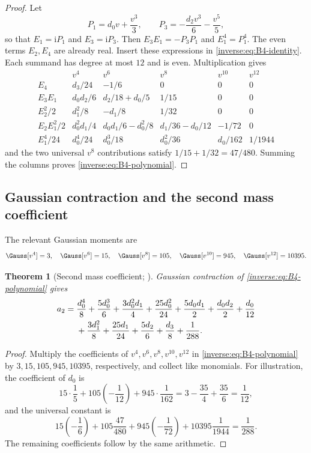 \documentclass[11pt,oneside]{article}
\newtheorem{theorem}{Theorem}[section]
\theoremstyle{definition}
\theoremstyle{remark}
\newcommand{\ii}{\mathrm i}
\begin{document}
\begin{proof}
Let
\[
 P_1=d_0v+\frac{v^3}{3},\qquad
 P_3=-\frac{d_2v^3}{6}-\frac{v^5}{5},
\]
so that $E_1=\ii P_1$ and $E_3=\ii P_3$.  Then
$E_3E_1=-P_3P_1$ and $E_1^4=P_1^4$.  The even terms $E_2,E_4$ are already
real.  Insert these expressions in \eqref{inverse:eq:B4-identity}.  Each summand
has degree at most $12$ and is even.  Multiplication gives
\[
\begin{array}{c|ccccc}
 &v^4&v^6&v^8&v^{10}&v^{12}\\
\hline
E_4&
 d_3/24&-1/6&0&0&0\\
E_3E_1&
 d_0d_2/6&d_2/18+d_0/5&1/15&0&0\\
E_2^2/2&
 d_1^2/8&-d_1/8&1/32&0&0\\
E_2E_1^2/2&
 d_0^2d_1/4&
 d_0d_1/6-d_0^2/8&
 d_1/36-d_0/12&
 -1/72&0\\
E_1^4/24&
 d_0^4/24&d_0^3/18&d_0^2/36&d_0/162&1/1944
\end{array}
\]
and the two universal $v^8$ contributions satisfy
$1/15+1/32=47/480$.  Summing the columns proves
\eqref{inverse:eq:B4-polynomial}.
\end{proof}

\subsection{Gaussian contraction and the second mass coefficient}

The relevant Gaussian moments are
\[
 \Gauss[v^4]=3,\quad
 \Gauss[v^6]=15,\quad
 \Gauss[v^8]=105,\quad
 \Gauss[v^{10}]=945,\quad
 \Gauss[v^{12}]=10395.
\]

\begin{theorem}[Second mass coefficient; \Formalized]
\label{inverse:thm:a2}
Gaussian contraction of \eqref{inverse:eq:B4-polynomial} gives
\begin{align}
 a_2={}&
 \frac{d_0^4}{8}+\frac{5d_0^3}{6}
 +\frac{3d_0^2d_1}{4}+\frac{25d_0^2}{24}
 +\frac{5d_0d_1}{2}+\frac{d_0d_2}{2}
 +\frac{d_0}{12} \notag\\
 &+\frac{3d_1^2}{8}+\frac{25d_1}{24}
 +\frac{5d_2}{6}+\frac{d_3}{8}
 +\frac1{288}. \label{inverse:eq:a2}
\end{align}
\end{theorem}

\begin{proof}
Multiply the coefficients of $v^4,v^6,v^8,v^{10},v^{12}$ in
\eqref{inverse:eq:B4-polynomial} by $3,15,105,945,10395$, respectively, and
collect like monomials.  For illustration, the coefficient of $d_0$ is
\[
 15\cdot\frac15
 +105\left(-\frac1{12}\right)
 +945\cdot\frac1{162}
 =3-\frac{35}{4}+\frac{35}{6}
 =\frac1{12},
\]
and the universal constant is
\[
 15\left(-\frac16\right)
 +105\frac{47}{480}
 +945\left(-\frac1{72}\right)
 +10395\frac1{1944}
 =\frac1{288}.
\]
The remaining coefficients follow by the same arithmetic.
\end{proof}
\end{document}
